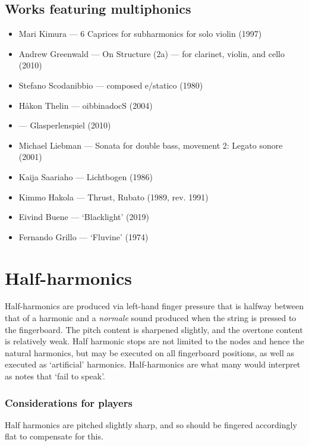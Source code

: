 \subsection{Works featuring multiphonics}\label{sec:multiphonicsLiterature}

\begin{itemize}
    \item Mari Kimura --- 6 Caprices for subharmonics for solo violin (1997) 
    \item Andrew Greenwald --- On Structure (2a) --- for clarinet, violin, and cello (2010)
    \item Stefano Scodanibbio --- composed e/statico (1980)
    \item Håkon Thelin --- oibbinadocS (2004)
    \item --- Glasperlenspiel (2010)
    \item Michael Liebman --- Sonata for double bass, movement 2: Legato sonore (2001)
    \item Kaija Saariaho --- Lichtbogen (1986)
    \item Kimmo Hakola --- Thrust, Rubato (1989, rev. 1991) 
    \item Eivind Buene --- `Blacklight' (2019)
    \item Fernando Grillo --- `Fluvine' (1974)
\end{itemize}

\section{Half-harmonics}\label{sec:half-harmonics}
Half-harmonics are produced via left-hand finger pressure that is halfway between that of a harmonic and a \emph{normale} sound produced when the string is pressed to the fingerboard.
The pitch content is sharpened slightly, and the overtone content is relatively weak.\autocite[113]{welbanksFoundationsModernCello}
Half harmonic stops are not limited to the nodes and hence the natural harmonics, but may be executed on all fingerboard positions, as well as executed as `artificial' harmonics.\autocite[127]{dimpkerExtendedNotationDepiction2012} 
Half-harmonics are what many would interpret as notes that `fail to speak'.

\subsubsection{Considerations for players}
Half harmonics are pitched slightly sharp, and so should be fingered accordingly flat to compensate for this.\autocite[113]{welbanksFoundationsModernCello}


